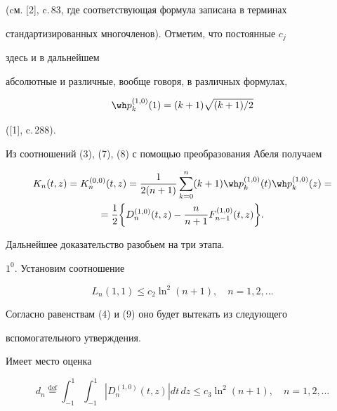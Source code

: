 (cм. [2], c.\,83, где соответствующая формула записана в терминах


стандартизированных многочленов). Отметим, что постоянные $c_j$


здесь и в дальнейшем


абсолютные и различные, вообще говоря, в различных формулах,


\begin{equation}


\wh p_k^{(1,0)}(1)=(k+1)\sqrt {(k+1)/2}


\end{equation}


([1], c.\,288).


Из соотношений (3), (7), (8) с помощью преобразования Абеля получаем


\begin{multline}


K_n (t,z)=K_n^{(0,0)}(t,z)=\frac{1}{2(n+1)}\sum_{k=0}^n (k+1)


\wh p_k^{(1,0)}(t) \wh p_k^{(1,0)}(z)= \\


%


=\frac{1}{2}\bigg\{D_n^{(1,0)}(t,z)-


\frac{n}{n+1}F_{n-1}^{(1,0)}(t,z)\bigg\}.


\end{multline}


Дальнейшее доказательство разобьем на три этапа.





$1^0$. Установим соотношение


\begin{equation}


L_n(1,1) \le c_2 \ln^2(n+1),\quad n=1,2,\dotsc


\end{equation}


Согласно равенствам (4) и (9) оно будет вытекать из следующего


вспомогательного утверждения.





\begin{lem} Имеет место оценка


\begin{equation}


d_n \overset{\mathrm{def}}{=}{} \int_{-1}^1\int_{-1}^1|


D_n^{(1,0)}(t,z)|dt\,dz \le c_3 \ln^2(n+1),\quad n=1,2,\dotsc


\end{equation}


\end{lem}





